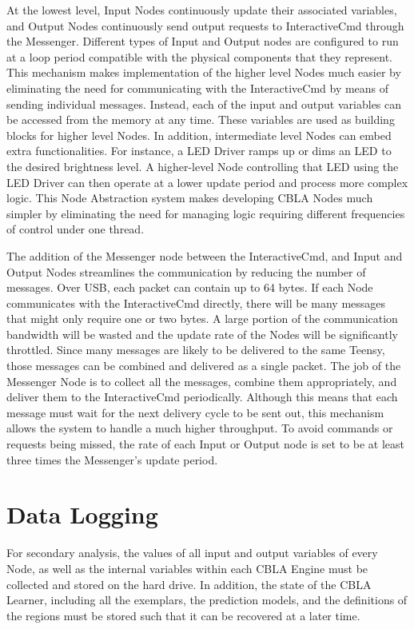At the lowest level, Input Nodes continuously update their associated variables, and Output Nodes continuously send output requests to InteractiveCmd through the Messenger. Different types of Input and Output nodes are configured to run at a loop period compatible with the physical components that they represent. This mechanism makes implementation of the higher level Nodes much easier by eliminating the need for communicating with the InteractiveCmd by means of sending individual messages. Instead, each of the input and output variables can be accessed from the memory at any time. These variables are used as building blocks for higher level Nodes. In addition, intermediate level Nodes can embed extra functionalities. For instance, a LED Driver ramps up or dims an LED to the desired brightness level. A higher-level Node controlling that LED using the LED Driver can then operate at a lower update period and process more complex logic. This Node Abstraction system makes developing CBLA Nodes much simpler by eliminating the need for managing logic requiring different frequencies of control under one thread. 

The addition of the Messenger node between the InteractiveCmd, and Input and Output Nodes streamlines the communication by reducing the number of messages. Over USB, each packet can contain up to 64 bytes. If each Node communicates with the InteractiveCmd directly, there will be many messages that might only require one or two bytes. A large portion of the communication bandwidth will be wasted and the update rate of the Nodes will be significantly throttled. Since many messages are likely to be delivered to the same Teensy, those messages can be combined and delivered as a single packet. The job of the Messenger Node is to collect all the messages, combine them appropriately, and deliver them to the InteractiveCmd periodically. Although this means that each message must wait for the next delivery cycle to be sent out, this mechanism allows the system to handle a much higher throughput. To avoid commands or requests being missed, the rate of each Input or Output node is set to be at least three times the Messenger's update period. 


\FloatBarrier
\section{Data Logging}

For secondary analysis, the values of all input and output variables of every Node, as well as the internal variables within each CBLA Engine must be collected and stored on the hard drive. In addition, the state of the CBLA Learner, including all the exemplars, the prediction models, and the definitions of the regions must be stored such that it can be recovered at a later time. 

